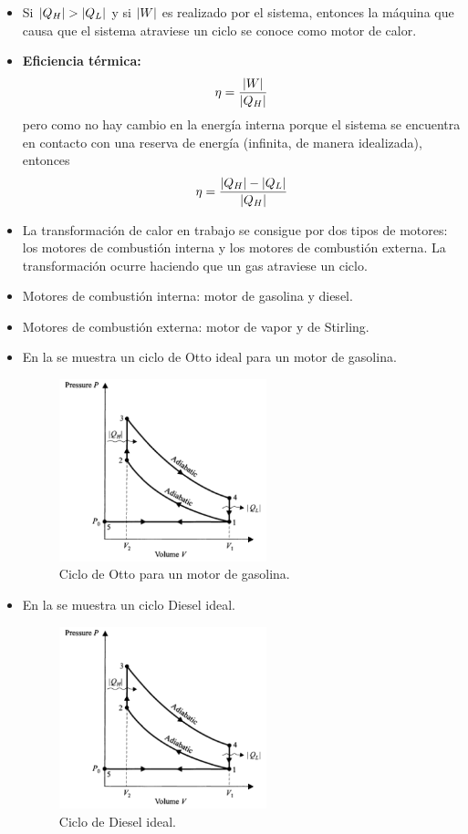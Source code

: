 \begin{itemize}
\item Si $\abs{Q_H}>\abs{Q_L}$ y si $\abs{W}$ es realizado por el sistema, 
entonces la máquina que causa que el sistema atraviese
un ciclo se conoce como motor de calor.
\item \textbf{Eficiencia térmica:} 
\begin{align}
\eta=\frac{\abs{W}}{\abs{Q_H}}
\label{•}
\end{align}
pero como no hay cambio en la energía interna porque 
el sistema se encuentra en contacto con una reserva de
energía (infinita, de manera idealizada), entonces
\begin{align}
\eta=\frac{\abs{Q_H}-\abs{Q_L}}{\abs{Q_H}}
\label{eq:thermal-eff	}	
\end{align}
\item La transformación de calor en trabajo se consigue 
por dos tipos de motores: los motores de combustión
interna y los motores de combustión externa. La 
transformación ocurre haciendo que un gas atraviese
un ciclo.
\item Motores de combustión interna: motor de gasolina
y diesel.
\item Motores de combustión externa: motor de vapor
y de Stirling.
\item En la  se muestra un ciclo de Otto ideal
para un motor de gasolina.
\begin{figure}
  \centering
  \includegraphics[width=6cm]{images/otto-cycle.png}
  \caption{Ciclo de Otto para un motor de gasolina.}
  \label{fig:otto-cycle}
\end{figure}
\item En la  se muestra un ciclo Diesel ideal.
\begin{figure}
  \centering
  \includegraphics[width=6cm]{images/otto-cycle.png}
  \caption{Ciclo de Diesel ideal.}
  \label{fig:diesel-cycle}
\end{figure}


\end{itemize}
